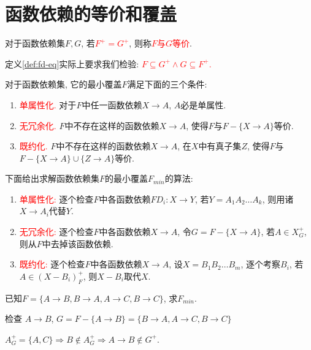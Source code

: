 \section{函数依赖的等价和覆盖}

\begin{definition}[函数依赖集的等价性]\label{def:fd-eq}
  对于函数依赖集$F,G$, 若\textcolor{red}{$F^+=G^+$}, 则称\textcolor{red}{$F$与$G$等价}.
\end{definition}

定义\ref{def:fd-eq}实际上要求我们检验: \textcolor{red}{$F\subseteq G^+\land G\subseteq F^+$.}

\begin{definition}[函数依赖集的最小覆盖]
  对于函数依赖集, 它的最小覆盖$F$满足下面的三个条件:
  \begin{enumerate}
      \item \textcolor{red}{单属性化.} 对于$F$中任一函数依赖$X\to A$, $A$必是单属性.
      \item \textcolor{red}{无冗余化.} $F$中不存在这样的函数依赖$X\to A$, 使得$F$与$F-\{X\to A\}$等价.
      \item \textcolor{red}{既约化.} $F$中不存在这样的函数依赖$X\to A$, 在$X$中有真子集$Z$, 使得$F$与$F-\{X\to A\}\cup \{Z\to A\}$等价.
  \end{enumerate}
\end{definition}

下面给出求解函数依赖集$F$的最小覆盖$F_{min}$的算法:
\begin{enumerate}
    \item \textcolor{red}{单属性化:} 逐个检查$F$中各函数依赖$FD_i: X\to Y$, 若$Y=A_1A_2\dots A_k$, 则用诸$X\to A_i$代替$Y$.
    \item \textcolor{red}{无冗余化:} 逐个检查$F$中各函数依赖$X\to A$, 令$G=F-\{X\to A\}$, 若$A\in X_G^+$, 则从$F$中去掉该函数依赖.
    \item \textcolor{red}{既约化:} 逐个检查$F$中各函数依赖$X\to A$, 设$X=B_1B_2\dots B_m$, 逐个考察$B_i$, 若$A\in (X-B_i)_F^+$, 则$X-B_i$取代$X$.
\end{enumerate}

\begin{example}
  已知$F=\{A\to B,B\to A,A\to C,B\to C\}$, 求$F_{min}$.
\end{example}

检查 $A \rightarrow B$, $G = F - \{A \rightarrow B\} = \{B \rightarrow A, A \rightarrow C, B \rightarrow C\}$

$ A_G^+ = \{A, C\} \Rightarrow B \notin A_G^+ \Rightarrow A \rightarrow B \notin G^+ $.

